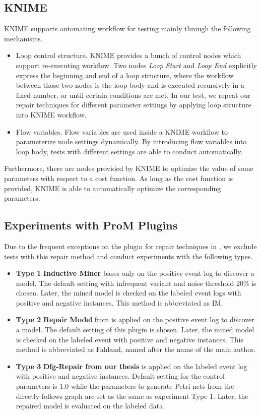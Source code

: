 \subsection{KNIME}
KNIME supports automating workflow for testing mainly through the following mechanisms. 
\begin{itemize}
	\item Loop control structure. KNIME provides a bunch of control nodes which support re-executing workflow.  Two nodes \emph{Loop Start} and \emph{Loop End} explicitly express the beginning and end of a loop structure, where the workflow between those two nodes is the loop body and is executed recursively in a fixed number, or until certain conditions are met. In our test, we repeat our repair techniques for different parameter settings by applying loop structure into KNIME workflow.
	\item Flow variables. Flow variables are used inside a KNIME workflow to parameterize node settings dynamically. By introducing flow variables into loop body, tests with different settings are able to conduct automatically.
\end{itemize}
Furthermore, there are nodes provided by KNIME to optimize the value of some parameters with respect to a cost function. As long as the cost function is provided, KNIME is able to automatically optimize the corresponding parameters. 

\subsection{ Experiments with ProM Plugins}
Due to the frequent exceptions on the plugin for repair techniques in \cite{dees2017enhancing}, we exclude tests with this repair method  and conduct experiments with the following types. 
\begin{itemize}
	\item \textbf{Type 1} \textbf{Inductive Miner} bases only on the positive event log to discover a model. The default setting with infrequent variant and noise threshold 20\% is chosen. Later, the mined model is checked on the labeled event logs with positive and negative instances. This method is abbreviated as IM.
	\item \textbf{Type 2} \textbf{Repair Model} from \cite{fahland2015model} is applied on the positive event log to discover a model. The default setting of this plugin is chosen. Later, the mined model is checked on the labeled event with positive and negative instances. This method is abbreviated as Fahland, named after the name of the main author.
	\item \textbf{Type 3} \textbf{Dfg-Repair from our thesis} is applied on the labeled event log with positive and negative instances. Default setting  for the control parameters is 1.0 while the parameters to generate Petri nets from the directly-follows graph are set as the same as experiment Type 1.  Later, the repaired model is evaluated on the labeled data. 
\end{itemize}

